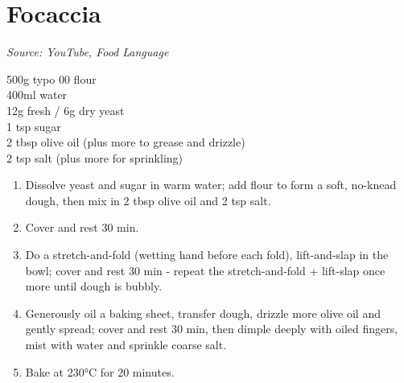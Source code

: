 \documentclass{report}
\begin{document}
\section{Focaccia}
\textit{Source: YouTube, Food Language}\\
\begin{minipage}[t]{0.21\textwidth} \vspace{0pt} 
\begin{flushleft}
500g typo 00 flour\\
400ml water\\
12g fresh / 6g dry yeast\\
1 tsp sugar\\
2 tbsp olive oil (plus more to grease and drizzle)\\
2 tsp salt (plus more for sprinkling)\\
\end{flushleft}
\end{minipage}
\hfill
\begin{minipage}[t]{0.78\textwidth} \vspace{0pt}
	\begin{enumerate}
		\item Dissolve yeast and sugar in warm water; add flour to form a soft, no-knead dough, then mix in 2 tbsp olive oil and 2 tsp salt.
		\item Cover and rest 30 min.
		\item Do a stretch-and-fold (wetting hand before each fold), lift-and-slap in the bowl; cover and rest 30 min - repeat the stretch-and-fold + lift-slap once more until dough is bubbly.
		\item Generously oil a baking sheet, transfer dough, drizzle more olive oil and gently spread; cover and rest 30 min, then dimple deeply with oiled fingers, mist with water and sprinkle coarse salt.
		\item Bake at 230°C for 20 minutes.
	\end{enumerate}
\end{minipage}
\end{document}
